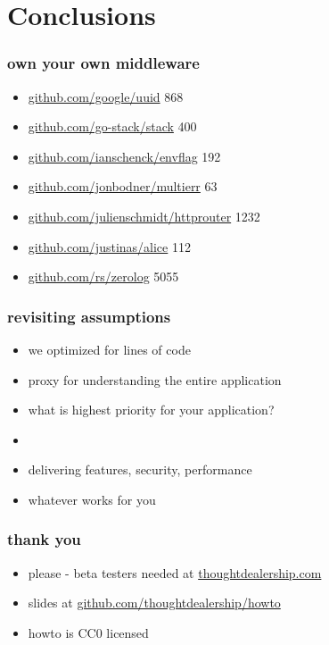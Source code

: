 \documentclass{beamer}
\begin{document}
\section{Conclusions}

\begin{frame}
\frametitle{own your own middleware}
\begin{itemize}
\item \href{https://github.com/google/uuid}{github.com/google/uuid} 868
\item \href{https://github.com/go-stack/stack}{github.com/go-stack/stack} 400
\item \href{https://github.com/ianschenck/envflag}{github.com/ianschenck/envflag} 192
\item \href{https://github.com/jonbodner/multierr}{github.com/jonbodner/multierr} 63
\item \href{https://github.com/julienschmidt/httprouter}{github.com/julienschmidt/httprouter} 1232
\item \href{https://github.com/justinas/alice}{github.com/justinas/alice} 112
\item \href{https://github.com/rs/zerolog}{github.com/rs/zerolog} 5055
\end{itemize}
\end{frame}

\begin{frame}
\frametitle{revisiting assumptions}
\begin{itemize}
\item we optimized for lines of code
\item proxy for understanding the entire application
\item what is highest priority for your application?
\item{}
\item<2-> delivering features, security, performance
\item<2-> whatever works for you
\end{itemize}
\end{frame}

\begin{frame}
	\frametitle{thank you}
	\begin{itemize}
		\item please - beta testers needed at \href{https://thoughtdealership.com}{thoughtdealership.com}
		\item slides at \href{https://github.com/thoughtdealership/howto}{github.com/thoughtdealership/howto}
		\item howto is CC0 licensed
	\end{itemize}
	\end{frame}
\end{document}
